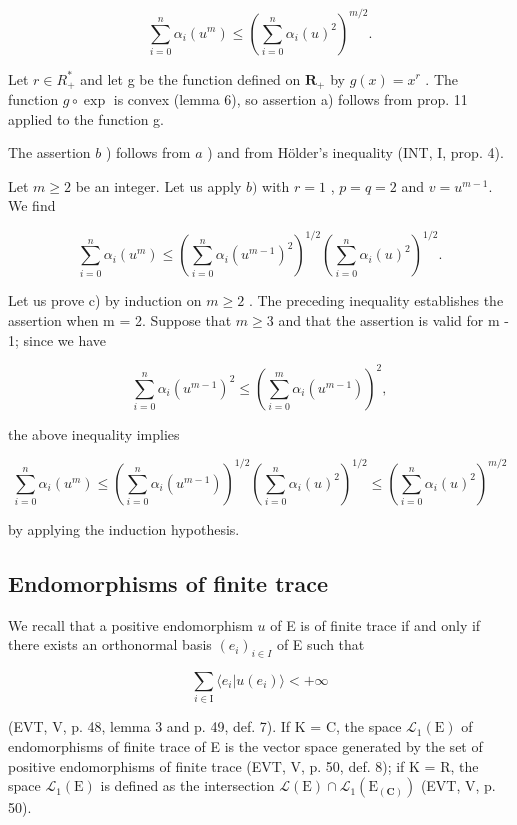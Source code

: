 \[
\sum_ {i = 0} ^ {n} \alpha_ {i} (u ^ {m}) \leqslant \left(\sum_ {i = 0} ^ {n} \alpha_ {i} (u) ^ {2}\right) ^ {m / 2}.
\]

Let \(r \in R_{+}^{*}\) and let g be the function defined on \(\mathbf{R}_{+}\) by \(g(x) = x^{r}\) . The function \(g \circ \exp\) is convex (lemma 6), so assertion a) follows from prop. 11 applied to the function g.

The assertion \(b\) ) follows from \(a\) ) and from Hölder's inequality (INT, I, prop. 4).

Let \(m \geqslant 2\) be an integer. Let us apply \(b)\) with \(r = 1\) , \(p = q = 2\) and \(v = u^{m-1}\). We find

\[
\sum_ {i = 0} ^ {n} \alpha_ {i} (u ^ {m}) \leqslant \left(\sum_ {i = 0} ^ {n} \alpha_ {i} (u ^ {m - 1}) ^ {2}\right) ^ {1 / 2} \left(\sum_ {i = 0} ^ {n} \alpha_ {i} (u) ^ {2}\right) ^ {1 / 2}.
\]

Let us prove c) by induction on \(m \geqslant 2\) . The preceding inequality establishes the assertion when m = 2. Suppose that \(m \geqslant 3\) and that the assertion is valid for m - 1; since we have

\[
\sum_ {i = 0} ^ {n} \alpha_ {i} (u ^ {m - 1}) ^ {2} \leqslant \left(\sum_ {i = 0} ^ {m} \alpha_ {i} (u ^ {m - 1})\right) ^ {2},
\]

the above inequality implies

\[
\sum_ {i = 0} ^ {n} \alpha_ {i} (u ^ {m}) \leqslant \left(\sum_ {i = 0} ^ {n} \alpha_ {i} (u ^ {m - 1})\right) ^ {1 / 2} \left(\sum_ {i = 0} ^ {n} \alpha_ {i} (u) ^ {2}\right) ^ {1 / 2} \leqslant \left(\sum_ {i = 0} ^ {n} \alpha_ {i} (u) ^ {2}\right) ^ {m / 2}
\]

by applying the induction hypothesis.

\subsection{Endomorphisms of finite trace}

We recall that a positive endomorphism \(u\) of E is of finite trace if and only if there exists an orthonormal basis \((e_i)_{i \in I}\) of E such that

\[
\sum_ {i \in \mathrm{I}} \langle e _ {i} | u (e _ {i}) \rangle <   + \infty
\]

(EVT, V, p. 48, lemma 3 and p. 49, def. 7). If K = C, the space \(\mathcal{L}_1(\mathrm{E})\) of endomorphisms of finite trace of E is the vector space generated by the set of positive endomorphisms of finite trace (EVT, V, p. 50, def. 8); if K = R, the space \(\mathcal{L}_1(\mathrm{E})\) is defined as the intersection \(\mathcal{L}(\mathrm{E}) \cap \mathcal{L}_1(\mathrm{E}_{(\mathbf{C})})\) (EVT, V, p. 50).


